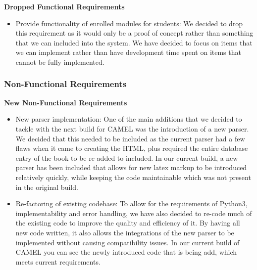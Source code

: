 	\textbf{Dropped Functional Requirements}
	\begin{itemize}
		\item Provide functionality of enrolled modules for students: We decided to drop this requirement as it would only be a proof of concept rather than something that we can included into the system. We have decided to focus on items that we can implement rather than have development time spent on items that cannot be fully implemented.  
	\end{itemize}
		
	\subsubsection{Non-Functional Requirements}
	\textbf{New Non-Functional Requirements}
	\begin{itemize}
		\item New parser implementation: One of the main additions that we decided to tackle with the next build for CAMEL was the introduction of a new parser. We decided that this needed to be included as the current parser had a few flaws when it came to creating the HTML, plus required the entire database entry of the book to be re-added to included. In our current build, a new parser has been included that allows for new latex markup to be introduced relatively quickly, while keeping the code maintainable which was not present in the original build.    
		\item Re-factoring of existing codebase: To allow for the requirements of Python3, implementability and error handling, we have also decided to re-code much of the existing code to improve the quality and efficiency of it. By having all new code written, it also allows the integrations of the new parser to be implemented without causing compatibility issues. In our current build of CAMEL you can see the newly introduced code that is being add, which meets current requirements.  
	\end{itemize}
	
